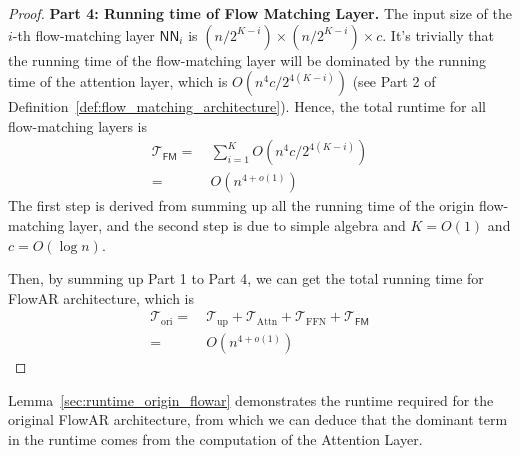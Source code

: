 \begin{proof}
    {\bf Part 4: Running time of Flow Matching Layer.} The input size of the $i$-th flow-matching layer $\mathsf{NN}_i$ is $ (n/2^{K-i}) \times (n/2^{K-i}) \times c $. It's trivially that the running time of the flow-matching layer will be dominated by the running time of the attention layer, which is $O(n^{4}c/ 2^{4(K-i)})$ (see Part 2 of Definition~\ref{def:flow_matching_architecture}). Hence, the total runtime for all flow-matching layers is 
    \begin{align*}
        \mathcal{T}_{\mathsf{FM}} =&~ \sum_{i=1}^K O(n^4 c /2^{4(K-i)})\\
        =&~ O(n^{4+o(1)})
    \end{align*}
    The first step is derived from summing up all the running time of the origin flow-matching layer, and the second step is due to simple algebra and $K = O(1)$ and $c = O(\log n)$.

    Then, by summing up Part 1 to Part 4, we can get the total running time for FlowAR architecture, which is
    \begin{align*}
        \mathcal{T}_{\mathrm{ori}} =&~ \mathcal{T}_{\mathrm{up}} + \mathcal{T}_{\mathrm{Attn}} + \mathcal{T}_{\mathrm{FFN}} + \mathcal{T}_{\mathsf{FM}}\\
        =&~ O(n^{4+o(1)})
    \end{align*}
\end{proof}
Lemma~\ref{sec:runtime_origin_flowar} demonstrates the runtime required for the original FlowAR architecture, from which we can deduce that the dominant term in the runtime comes from the computation of the Attention Layer.
